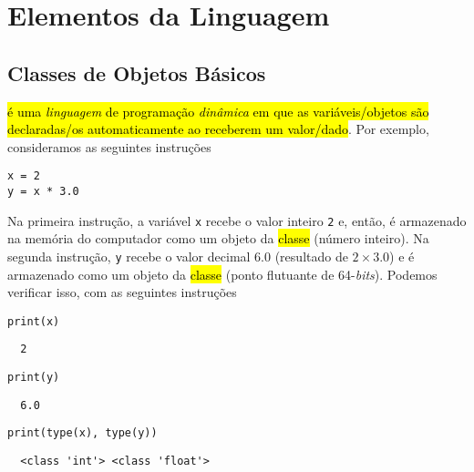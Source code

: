 
\section{Elementos da Linguagem}\label{sec_elem}

\subsection{Classes de Objetos Básicos}

\hl{{\python} é uma \emph{linguagem} de programação \emph{dinâmica} em que as variáveis/objetos são declaradas/os automaticamente ao receberem um valor/dado}. Por exemplo, consideramos as seguintes instruções

\begin{lstlisting}
x = 2
y = x * 3.0
\end{lstlisting}

Na primeira instrução, a variável \texttt{x} recebe o valor inteiro \texttt{2} e, então, é armazenado na memória do computador como um objeto da \hl{classe {\PYTHONint}} (número inteiro). Na segunda instrução, \texttt{y} recebe o valor decimal $6.0$ (resultado de $2\times 3.0$) e é armazenado como um objeto da \hl{classe {\PYTHONfloat}} (ponto flutuante de 64-{\it bits}). Podemos verificar isso, com as seguintes instruções

\begin{lstlisting}
print(x)
\end{lstlisting}

\begin{verbatim}
  2
\end{verbatim}

\begin{lstlisting}
print(y)
\end{lstlisting}

\begin{verbatim}
  6.0
\end{verbatim}

\begin{lstlisting}
print(type(x), type(y))
\end{lstlisting}

\begin{verbatim}
  <class 'int'> <class 'float'>
\end{verbatim}

